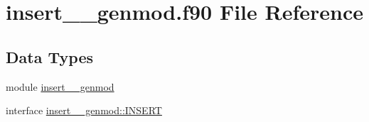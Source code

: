 \hypertarget{insert____genmod_8f90}{\section{insert\+\_\+\+\_\+genmod.\+f90 File Reference}
\label{insert____genmod_8f90}
}
\subsection*{Data Types}
\begin{DoxyCompactItemize}
\item 
module \hyperlink{classinsert____genmod}{insert\+\_\+\+\_\+genmod}
\item 
interface \hyperlink{interfaceinsert____genmod_1_1INSERT}{insert\+\_\+\+\_\+genmod\+::\+I\+N\+S\+E\+R\+T}
\end{DoxyCompactItemize}
